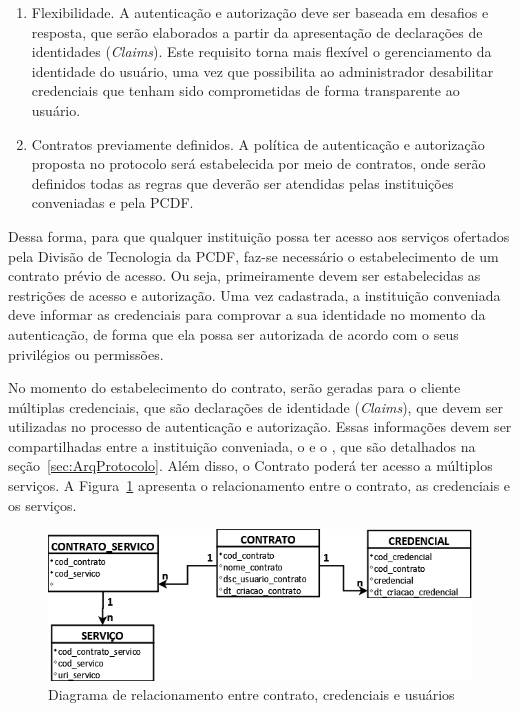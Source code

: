 \begin{enumerate}[RQ1]
\item Flexibilidade. A autenticação e autorização deve ser baseada em desafios e resposta, que serão elaborados a partir da apresentação de declarações de identidades (\emph{Claims}). Este requisito torna mais flexível o gerenciamento da identidade do usuário, uma vez que possibilita ao administrador desabilitar credenciais que tenham sido comprometidas de forma transparente ao usuário.

\item Contratos previamente definidos. A política de autenticação e autorização proposta no protocolo será estabelecida por meio de contratos, onde serão definidos todas as regras que deverão ser atendidas pelas instituições conveniadas e pela PCDF.

\end{enumerate}

Dessa forma, para que qualquer instituição possa ter acesso aos serviços ofertados pela Divisão de Tecnologia da PCDF, faz-se necessário o estabelecimento de um contrato prévio de acesso. Ou seja, primeiramente devem ser estabelecidas as restrições de acesso e autorização. Uma vez cadastrada, a instituição conveniada deve informar as credenciais para comprovar a sua identidade no momento da autenticação, de forma que ela possa ser autorizada de acordo com o seus privilégios ou permissões.

No momento do estabelecimento do contrato, serão geradas para o cliente múltiplas credenciais, que são declarações de identidade (\emph{Claims}), que devem ser utilizadas no processo de autenticação e autorização. Essas informações devem ser compartilhadas entre a instituição conveniada, o \servidorAA e o \servidorRest, que são detalhados na seção~\ref{sec:ArqProtocolo}. Além disso, o Contrato poderá ter acesso a múltiplos serviços. A Figura~\ref{fig:diagrama_relacionamento} apresenta o relacionamento entre o contrato, as credenciais e os serviços.

\begin{figure}[!htb]
    \centering
    \includegraphics[width=1.0\textwidth]{modelo_relacionamento_contrato1.png}
    \caption{Diagrama de relacionamento entre contrato, credenciais e usuários}
    \label{fig:diagrama_relacionamento}
\end{figure}


